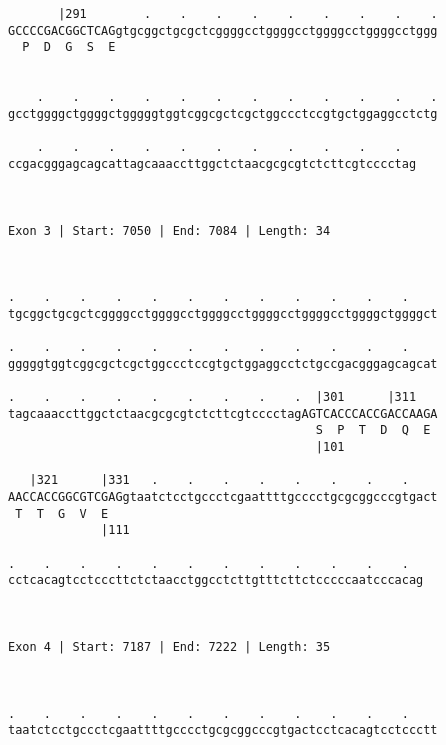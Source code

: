 \documentclass{article}
\begin{document}
\begin{Verbatim}
       |291        .    .    .    .    .    .    .    .    .
GCCCCGACGGCTCAGgtgcggctgcgctcggggcctggggcctggggcctggggcctggg
  P  D  G  S  E                                             
                                                            
  
    .    .    .    .    .    .    .    .    .    .    .    .
gcctggggctggggctgggggtggtcggcgctcgctggccctccgtgctggaggcctctg
                                                            
    .    .    .    .    .    .    .    .    .    .    .  
ccgacgggagcagcattagcaaaccttggctctaacgcgcgtctcttcgtcccctag
                                                         
                                                         
 
Exon 3 | Start: 7050 | End: 7084 | Length: 34



.    .    .    .    .    .    .    .    .    .    .    .    
tgcggctgcgctcggggcctggggcctggggcctggggcctggggcctggggctggggct
                                                            
.    .    .    .    .    .    .    .    .    .    .    .    
gggggtggtcggcgctcgctggccctccgtgctggaggcctctgccgacgggagcagcat
                                                            
.    .    .    .    .    .    .    .    .  |301      |311   
tagcaaaccttggctctaacgcgcgtctcttcgtcccctagAGTCACCCACCGACCAAGA
                                           S  P  T  D  Q  E 
                                           |101             
  
   |321      |331   .    .    .    .    .    .    .    .    
AACCACCGGCGTCGAGgtaatctcctgccctcgaattttgcccctgcgcggcccgtgact
 T  T  G  V  E                                              
             |111                                           
  
.    .    .    .    .    .    .    .    .    .    .    .  
cctcacagtcctcccttctctaacctggcctcttgtttcttctcccccaatcccacag
                                                          
                                                          
 
Exon 4 | Start: 7187 | End: 7222 | Length: 35



.    .    .    .    .    .    .    .    .    .    .    .    
taatctcctgccctcgaattttgcccctgcgcggcccgtgactcctcacagtcctccctt
                                                            

\end{Verbatim}
\end{document}
